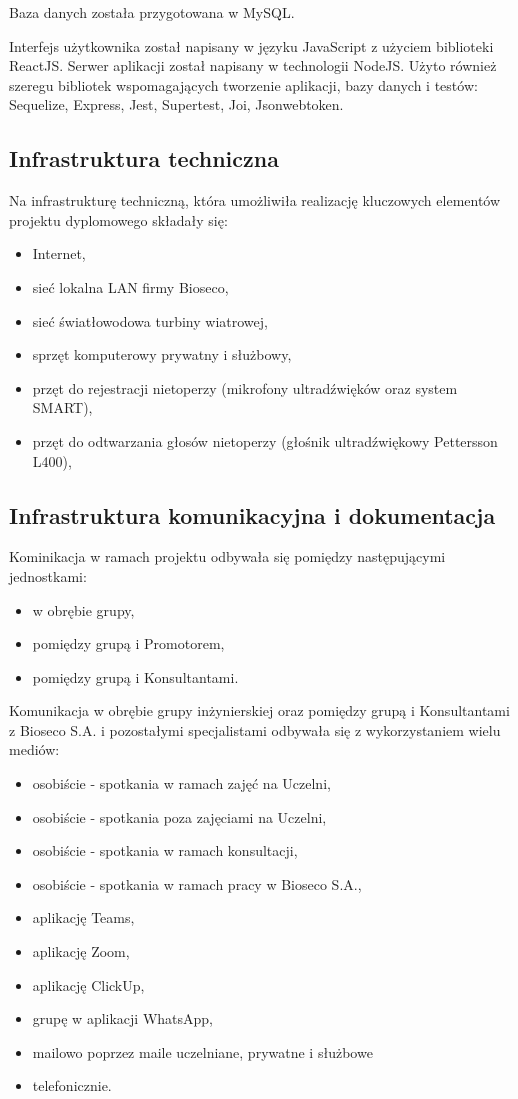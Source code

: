 \documentclass{sprz}
\begin{document}
Baza danych została przygotowana w MySQL.

Interfejs użytkownika został napisany w języku JavaScript z użyciem biblioteki ReactJS. Serwer aplikacji został napisany w technologii NodeJS. Użyto również szeregu bibliotek wspomagających tworzenie aplikacji, bazy danych i testów: Sequelize, Express, Jest, Supertest, Joi, Jsonwebtoken. 

\subsection{Infrastruktura techniczna}
Na infrastrukturę techniczną, która umożliwiła realizację kluczowych elementów projektu dyplomowego składały się:
\begin{itemize}
  \item{Internet,}
  \item{sieć lokalna LAN firmy Bioseco,}
  \item{sieć światłowodowa turbiny wiatrowej,}
  \item{sprzęt komputerowy prywatny i służbowy,}
  \item{przęt do rejestracji nietoperzy (mikrofony ultradźwięków oraz system SMART),}
  \item{przęt do odtwarzania głosów nietoperzy (głośnik ultradźwiękowy Pettersson L400),}
  \end{itemize}

\subsection{Infrastruktura komunikacyjna i dokumentacja}
Kominikacja w ramach projektu odbywała się pomiędzy następującymi jednostkami:
\begin{itemize}
  \item{w obrębie grupy,}
  \item{pomiędzy grupą i Promotorem,}
  \item{pomiędzy grupą i Konsultantami.}
  \end{itemize}

Komunikacja w obrębie grupy inżynierskiej oraz pomiędzy grupą i Konsultantami z Bioseco S.A. i pozostałymi specjalistami odbywała się z wykorzystaniem wielu mediów:
\begin{itemize}
  \item{osobiście - spotkania w ramach zajęć na Uczelni,}
  \item{osobiście - spotkania poza zajęciami na Uczelni,}
  \item{osobiście - spotkania w ramach konsultacji,}
  \item{osobiście - spotkania w ramach pracy w Bioseco S.A.,}
  \item{aplikację Teams,}
  \item{aplikację Zoom,}
  \item{aplikację ClickUp,}
  \item{grupę w aplikacji WhatsApp,}
  \item{mailowo poprzez maile uczelniane, prywatne i służbowe}
  \item{telefonicznie.}
  \end{itemize}
\end{document}
